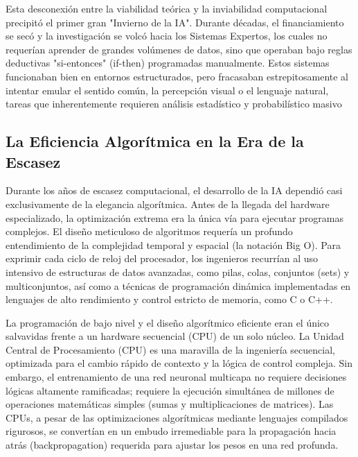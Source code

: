 \documentclass[12pt,a4paper]{article}
\begin{document}

\newpage
Esta desconexión entre la viabilidad teórica y la inviabilidad computacional precipitó el primer gran "Invierno de la IA". Durante décadas, el financiamiento se secó y la investigación se volcó hacia los Sistemas Expertos, los cuales no requerían aprender de grandes volúmenes de datos, sino que operaban bajo reglas deductivas "si-entonces" (if-then) programadas manualmente. Estos sistemas funcionaban bien en entornos estructurados, pero fracasaban estrepitosamente al intentar emular el sentido común, la percepción visual o el lenguaje natural, tareas que inherentemente requieren análisis estadístico y probabilístico masivo

\subsection{La Eficiencia Algorítmica en la Era de la Escasez}

Durante los años de escasez computacional, el desarrollo de la IA dependió casi exclusivamente de la elegancia algorítmica. Antes de la llegada del hardware especializado, la optimización extrema era la única vía para ejecutar programas complejos. El diseño meticuloso de algoritmos requería un profundo entendimiento de la complejidad temporal y espacial (la notación Big O). Para exprimir cada ciclo de reloj del procesador, los ingenieros recurrían al uso intensivo de estructuras de datos avanzadas, como pilas, colas, conjuntos (sets) y multiconjuntos, así como a técnicas de programación dinámica implementadas en lenguajes de alto rendimiento y control estricto de memoria, como C o C++.

La programación de bajo nivel y el diseño algorítmico eficiente eran el único salvavidas frente a un hardware secuencial (CPU) de un solo núcleo. La Unidad Central de Procesamiento (CPU) es una maravilla de la ingeniería secuencial, optimizada para el cambio rápido de contexto y la lógica de control compleja. Sin embargo, el entrenamiento de una red neuronal multicapa no requiere decisiones lógicas altamente ramificadas; requiere la ejecución simultánea de millones de operaciones matemáticas simples (sumas y multiplicaciones de matrices). Las CPUs, a pesar de las optimizaciones algorítmicas mediante lenguajes compilados rigurosos, se convertían en un embudo irremediable para la propagación hacia atrás (backpropagation) requerida para ajustar los pesos en una red profunda.
\end{document}
